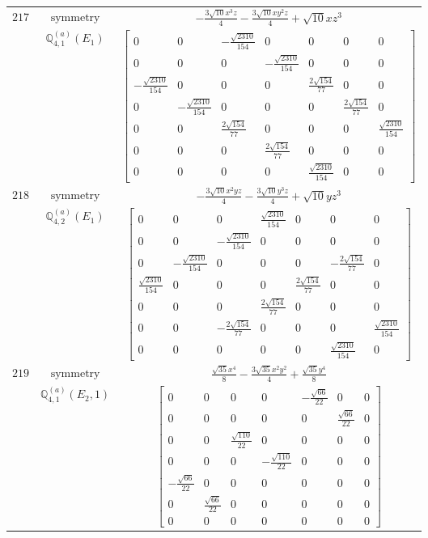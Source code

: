 \documentclass[fleqn,8pt,landscape]{jsarticle}
\begin{document}
\begin{longtable}{ccc}
$ 217 $ & $ \text{symmetry} $ & $ - \frac{3 \sqrt{10} x^{3} z}{4} - \frac{3 \sqrt{10} x y^{2} z}{4} + \sqrt{10} x z^{3} $ \\
$  $ & $ \mathbb{Q}_{4,1}^{(a)}(E_{1}) $ & $ \begin{bmatrix} 0 & 0 & - \frac{\sqrt{2310}}{154} & 0 & 0 & 0 & 0 \\ 0 & 0 & 0 & - \frac{\sqrt{2310}}{154} & 0 & 0 & 0 \\ - \frac{\sqrt{2310}}{154} & 0 & 0 & 0 & \frac{2 \sqrt{154}}{77} & 0 & 0 \\ 0 & - \frac{\sqrt{2310}}{154} & 0 & 0 & 0 & \frac{2 \sqrt{154}}{77} & 0 \\ 0 & 0 & \frac{2 \sqrt{154}}{77} & 0 & 0 & 0 & \frac{\sqrt{2310}}{154} \\ 0 & 0 & 0 & \frac{2 \sqrt{154}}{77} & 0 & 0 & 0 \\ 0 & 0 & 0 & 0 & \frac{\sqrt{2310}}{154} & 0 & 0 \end{bmatrix} $ \\ \hline
$ 218 $ & $ \text{symmetry} $ & $ - \frac{3 \sqrt{10} x^{2} y z}{4} - \frac{3 \sqrt{10} y^{3} z}{4} + \sqrt{10} y z^{3} $ \\
$  $ & $ \mathbb{Q}_{4,2}^{(a)}(E_{1}) $ & $ \begin{bmatrix} 0 & 0 & 0 & \frac{\sqrt{2310}}{154} & 0 & 0 & 0 \\ 0 & 0 & - \frac{\sqrt{2310}}{154} & 0 & 0 & 0 & 0 \\ 0 & - \frac{\sqrt{2310}}{154} & 0 & 0 & 0 & - \frac{2 \sqrt{154}}{77} & 0 \\ \frac{\sqrt{2310}}{154} & 0 & 0 & 0 & \frac{2 \sqrt{154}}{77} & 0 & 0 \\ 0 & 0 & 0 & \frac{2 \sqrt{154}}{77} & 0 & 0 & 0 \\ 0 & 0 & - \frac{2 \sqrt{154}}{77} & 0 & 0 & 0 & \frac{\sqrt{2310}}{154} \\ 0 & 0 & 0 & 0 & 0 & \frac{\sqrt{2310}}{154} & 0 \end{bmatrix} $ \\ \hline
$ 219 $ & $ \text{symmetry} $ & $ \frac{\sqrt{35} x^{4}}{8} - \frac{3 \sqrt{35} x^{2} y^{2}}{4} + \frac{\sqrt{35} y^{4}}{8} $ \\
$  $ & $ \mathbb{Q}_{4,1}^{(a)}(E_{2},1) $ & $ \begin{bmatrix} 0 & 0 & 0 & 0 & - \frac{\sqrt{66}}{22} & 0 & 0 \\ 0 & 0 & 0 & 0 & 0 & \frac{\sqrt{66}}{22} & 0 \\ 0 & 0 & \frac{\sqrt{110}}{22} & 0 & 0 & 0 & 0 \\ 0 & 0 & 0 & - \frac{\sqrt{110}}{22} & 0 & 0 & 0 \\ - \frac{\sqrt{66}}{22} & 0 & 0 & 0 & 0 & 0 & 0 \\ 0 & \frac{\sqrt{66}}{22} & 0 & 0 & 0 & 0 & 0 \\ 0 & 0 & 0 & 0 & 0 & 0 & 0 \end{bmatrix} $ \\ \hline

\end{longtable}
\end{document}
